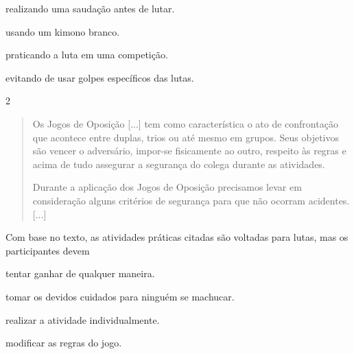 \begin{escolha}
\item realizando uma saudação antes de lutar.

\item usando um kimono branco.

\item praticando a luta em uma competição.

\item evitando de usar golpes específicos das lutas.
\end{escolha}


\num{2}
\begin{quote}
  Os Jogos de Oposição {[}...{]} tem como característica o ato de
  confrontação que acontece entre duplas, trios ou até mesmo em grupos.
  Seus objetivos são vencer o adversário, impor-se fisicamente ao outro,
  respeito às regras e acima de tudo assegurar a segurança do colega
  durante as atividades.

Durante a aplicação dos Jogos de Oposição precisamos levar em
consideração alguns critérios de segurança para que não ocorram
acidentes. {[}...{]}

\end{quote}

Com base no texto, as atividades práticas citadas são voltadas para
lutas, mas os participantes devem

\begin{escolha}
\item tentar ganhar de qualquer maneira.

\item tomar os devidos cuidados para ninguém se machucar.

\item realizar a atividade individualmente.

\item modificar as regras do jogo.
\end{escolha}

